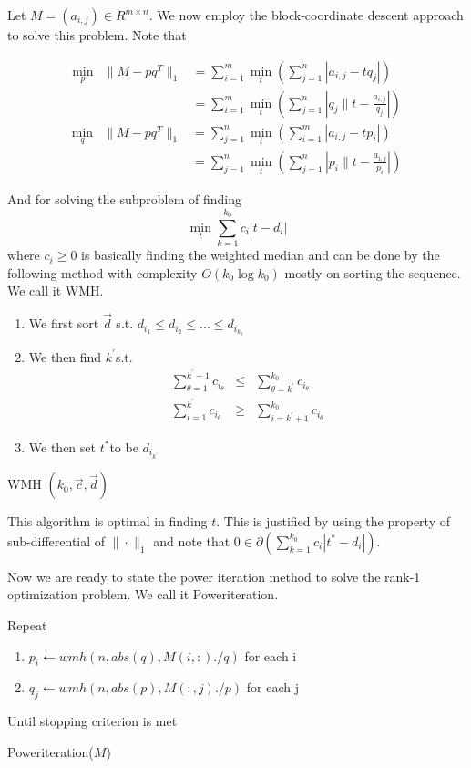 Let $M=(a_{i,j})\in R^{m \times n}$. We now employ the block-coordinate
descent approach to solve this problem. Note that

\begin{eqnarray}
\min_{p} & \|M-pq^{T}\|_{1} & =\sum_{i=1}^{m}\min_{t}(\sum_{j=1}^{n}|a_{i,j}-tq_{j}|)\\
 &  & =\sum_{i=1}^{m}\min_{t}(\sum_{j=1}^{n}|q_{j}\|t-\frac{a_{i,j}}{q_{j}}|)\nonumber
\end{eqnarray}
\begin{eqnarray}
\min_{q} & \|M-pq^{T}\|_{1} & =\sum_{j=1}^{n}\min_{t}(\sum_{i=1}^{m}|a_{i,j}-tp_{i}|)\\
 &  & =\sum_{j=1}^{n}\min_{t}(\sum_{j=1}^{n}|p_{i}\|t-\frac{a_{i,j}}{p_{i}}|)\nonumber
\end{eqnarray}


And for solving the subproblem of finding
\[
\min_{t}\sum_{k=1}^{k_{0}}c_{i}|t-d_{i}|
\]
where $c_{i}\ge0$ is basically finding the weighted median and can
be done by the following method with complexity $O(k_{0}\log k_{0})$
mostly on sorting the sequence. We call it WMH.

\begin{algorithm}[h]
\begin{enumerate}
\item We first sort $\vec{\ensuremath{d}}$ s.t. $d_{i_{1}}\le d_{i_{2}}\le...\le d_{i_{k_{0}}}$
\item We then find $k^{'}$s.t.
\begin{eqnarray*}
\sum_{\theta=1}^{k^{'}-1}c_{i_{\theta}} & \le & \sum_{\theta=k^{'}}^{k_{0}}c_{i_{\theta}}\\
\sum_{i=1}^{k^{'}}c_{i_{\theta}} & \ge & \sum_{i=k^{'}+1}^{k_{0}}c_{i_{\theta}}
\end{eqnarray*}

\item We then set $t^{*}$to be $d_{i_{k^{'}}}$
\end{enumerate}
\caption{WMH $(k_{0},\vec{c},\vec{d})$}
\end{algorithm}


This algorithm is optimal in finding $t$. This is justified by using
the property of sub-differential of $\|\cdot\|_{1}$ and note that
$0\in\partial(\sum_{k=1}^{k_{0}}c_{i}|t^{*}-d_{i}|)$.

Now we are ready to state the power iteration method to solve the
rank-1 optimization problem. We call it Poweriteration.

\begin{algorithm}[h]
Repeat
\begin{enumerate}
\item $p_{i}\leftarrow wmh(n,abs(q),M(i,:)./q)$ for each i
\item $q_{j}\leftarrow wmh(n,abs(p),M(:,j)./p)$ for each j
\end{enumerate}
Until stopping criterion is met

\caption{Poweriteration($M$)}
\end{algorithm}



